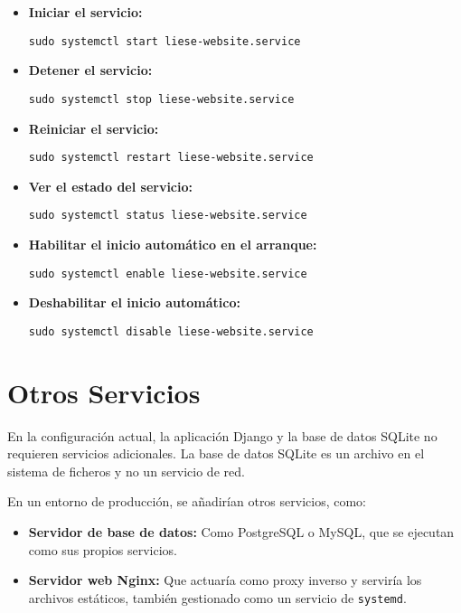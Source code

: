 \begin{itemize}
    \item \textbf{Iniciar el servicio:}
    \begin{verbatim}sudo systemctl start liese-website.service\end{verbatim}
    \item \textbf{Detener el servicio:}
    \begin{verbatim}sudo systemctl stop liese-website.service\end{verbatim}
    \item \textbf{Reiniciar el servicio:}
    \begin{verbatim}sudo systemctl restart liese-website.service\end{verbatim}
    \item \textbf{Ver el estado del servicio:}
    \begin{verbatim}sudo systemctl status liese-website.service\end{verbatim}
    \item \textbf{Habilitar el inicio automático en el arranque:}
    \begin{verbatim}sudo systemctl enable liese-website.service\end{verbatim}
    \item \textbf{Deshabilitar el inicio automático:}
    \begin{verbatim}sudo systemctl disable liese-website.service\end{verbatim}
\end{itemize}

\section{Otros Servicios}

En la configuración actual, la aplicación Django y la base de datos SQLite no requieren servicios adicionales. La base de datos SQLite es un archivo en el sistema de ficheros y no un servicio de red.

En un entorno de producción, se añadirían otros servicios, como:
\begin{itemize}
    \item \textbf{Servidor de base de datos:} Como PostgreSQL o MySQL, que se ejecutan como sus propios servicios.
    \item \textbf{Servidor web Nginx:} Que actuaría como proxy inverso y serviría los archivos estáticos, también gestionado como un servicio de \texttt{systemd}.
\end{itemize}